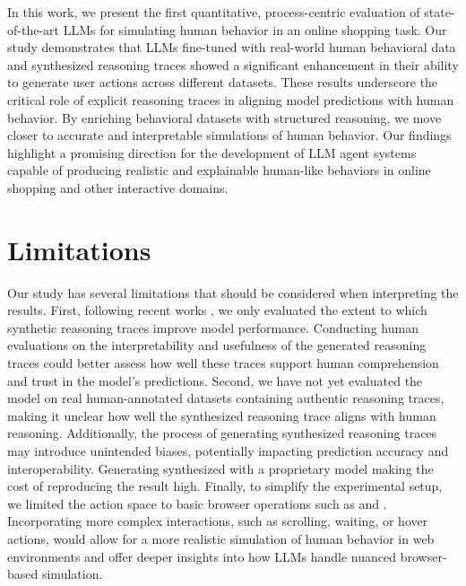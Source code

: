 \documentclass{article} %
\begin{document}
In this work, we present the first quantitative, process-centric evaluation of state-of-the-art LLMs for simulating human behavior in an online shopping task.
Our study demonstrates that LLMs fine-tuned with real-world human behavioral data and synthesized reasoning traces showed a significant enhancement in their ability to generate user actions across different datasets.
These results underscore the critical role of explicit reasoning traces in aligning model predictions with human behavior.
By enriching behavioral datasets with structured reasoning, we move closer to accurate and interpretable simulations of human behavior.
Our findings highlight a promising direction for the development of LLM agent systems capable of producing realistic and explainable human-like behaviors in online shopping and other interactive domains.

\section*{Limitations}

Our study has several limitations that should be considered when interpreting the results. 
First, following recent works \cite{deepseek-aiDeepSeekR1IncentivizingReasoning2025}, we only evaluated the extent to which synthetic reasoning traces improve model performance.
Conducting human evaluations on the interpretability and usefulness of the generated reasoning traces could better assess how well these traces support human comprehension and trust in the model's predictions.
Second, we have not yet evaluated the model on real human-annotated datasets containing authentic reasoning traces, making it unclear how well the synthesized reasoning trace aligns with human reasoning. Additionally, the process of generating synthesized reasoning traces may introduce unintended biases, potentially impacting prediction accuracy and interoperability. Generating synthesized with a proprietary model making the cost of reproducing the result high.
Finally, to simplify the experimental setup, we limited the action space to basic browser operations such as  and . Incorporating more complex interactions, such as scrolling, waiting, or hover actions, would allow for a more realistic simulation of human behavior in web environments and offer deeper insights into how LLMs handle nuanced browser-based simulation.


\end{document}
